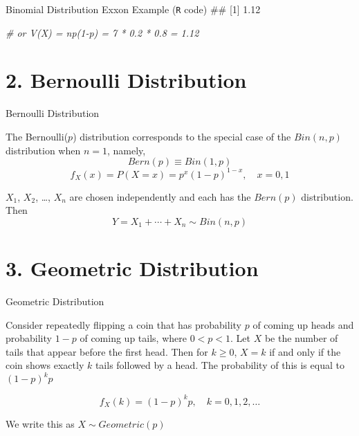 \documentclass[12pt,ignorenonframetext,compress]{beamer}
\newenvironment{Shaded}{\begin{snugshade}}{\end{snugshade}}
\newcommand{\CommentTok}[1]{\textcolor[rgb]{0.56,0.35,0.01}{\textit{#1}}}
\let\oldShaded\Shaded
\let\endoldShaded\endShaded
\renewenvironment{Shaded}{\scriptsize\oldShaded}{\endoldShaded}
\let\oldverbatim\verbatim
\let\endoldverbatim\endverbatim
\renewenvironment{verbatim}{\scriptsize\oldverbatim}{\endoldverbatim}
\begin{document}
\begin{frame}[fragile]{Binomial Distribution Exxon Example (\texttt{R}
code)}
\begin{verbatim}
## [1] 1.12
\end{verbatim}

\begin{Shaded}
\begin{Highlighting}[]
\CommentTok{# or V(X) = np(1-p) = 7 * 0.2 * 0.8 = 1.12}
\end{Highlighting}
\end{Shaded}

\end{frame}

\section{2. Bernoulli Distribution}\label{bernoulli-distribution}

\begin{frame}{Bernoulli Distribution}

The Bernoulli(\(p\)) distribution corresponds to the special case of the
\(Bin(n, p)\) distribution when \(n=1\), namely,
\[ Bern(p) \equiv Bin(1,p)\]
\[ f_X(x) = P(X=x) = p^x (1-p)^{1-x}, \quad   x = 0,1 \]

\pause

\(X_1\), \(X_2\), \ldots, \(X_n\) are chosen independently and each has
the \(Bern(p)\) distribution. Then
\[ Y= X_1+ \cdots+ X_n \sim Bin(n, p )\]

\end{frame}

\section{3. Geometric Distribution}\label{geometric-distribution}

\begin{frame}{Geometric Distribution}

Consider repeatedly flipping a coin that has probability \(p\) of coming
up heads and probability \(1-p\) of coming up tails, where
\(0 < p < 1\). Let \(X\) be the number of tails that appear before the
first head. Then for \(k\geq 0\), \(X=k\) if and only if the coin shows
exactly \(k\) tails followed by a head. The probability of this is equal
to \((1-p)^k p\)

\[f_X(k) = (1-p)^k p, \quad k = 0, 1, 2, \ldots \]

We write this as \(X\sim Geometric(p)\)

\end{frame}
\end{document}
